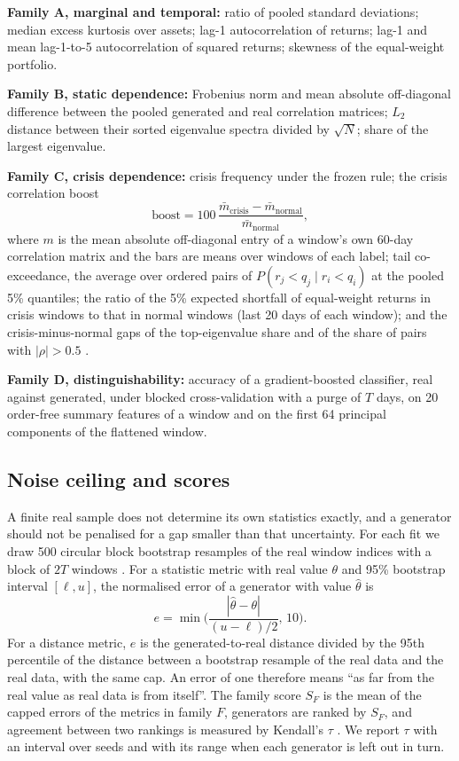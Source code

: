 \documentclass[journal]{IEEEtran}
\begin{document}
\textbf{Family A, marginal and temporal:} ratio of pooled standard deviations; median excess kurtosis over
assets; lag-1 autocorrelation of returns; lag-1 and mean lag-1-to-5 autocorrelation of squared returns;
skewness of the equal-weight portfolio.

\textbf{Family B, static dependence:} Frobenius norm and mean absolute off-diagonal difference between the
pooled generated and real correlation matrices; $L_2$ distance between their sorted eigenvalue spectra divided
by $\sqrt{N}$; share of the largest eigenvalue.

\textbf{Family C, crisis dependence:} crisis frequency under the frozen rule; the crisis correlation boost
\begin{equation}
\mathrm{boost} = 100\,\frac{\bar m_{\mathrm{crisis}} - \bar m_{\mathrm{normal}}}{\bar m_{\mathrm{normal}}},
\label{eq:boost}
\end{equation}
where $m$ is the mean absolute off-diagonal entry of a window's own 60-day correlation matrix and the bars are
means over windows of each label; tail co-exceedance, the average over ordered pairs of
$P(r_j<q_j \mid r_i<q_i)$ at the pooled 5\% quantiles; the ratio of the 5\% expected shortfall of equal-weight
returns in crisis windows to that in normal windows (last 20 days of each window); and the crisis-minus-normal
gaps of the top-eigenvalue share \cite{kritzman2011absorption} and of the share of pairs with $|\rho|>0.5$
\cite{diebold2014network}.

\textbf{Family D, distinguishability:} accuracy of a gradient-boosted classifier, real against generated, under
blocked cross-validation with a purge of $T$ days, on 20 order-free summary features of a window and on the
first 64 principal components of the flattened window.

\subsection{Noise ceiling and scores}
\label{sec:ceiling}
A finite real sample does not determine its own statistics exactly, and a generator should not be penalised
for a gap smaller than that uncertainty. For each fit we draw 500 circular block bootstrap resamples of the
real window indices with a block of $2T$ windows \cite{politis1994stationary}. For a statistic metric with real
value $\theta$ and 95\% bootstrap interval $[\ell,u]$, the normalised error of a generator with value
$\hat\theta$ is
\begin{equation}
e = \min\!\Big(\frac{|\hat\theta-\theta|}{(u-\ell)/2},\,10\Big).
\label{eq:nerr}
\end{equation}
For a distance metric, $e$ is the generated-to-real distance divided by the 95th percentile of the distance
between a bootstrap resample of the real data and the real data, with the same cap. An error of one therefore
means ``as far from the real value as real data is from itself''. The family score $S_F$ is the mean of the
capped errors of the metrics in family $F$, generators are ranked by $S_F$, and agreement between two rankings
is measured by Kendall's $\tau$ \cite{kendall1938rank}. We report $\tau$ with an interval over seeds and with
its range when each generator is left out in turn.
\end{document}
